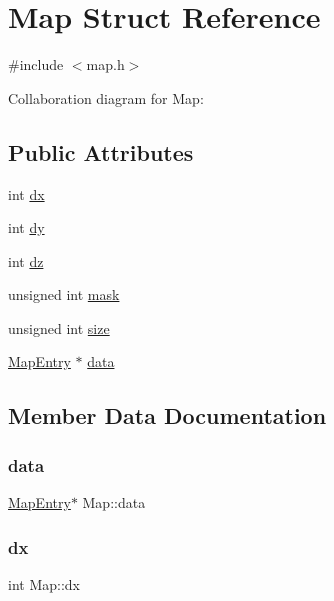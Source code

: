\hypertarget{structMap}{}\section{Map Struct Reference}
\label{structMap}


{\ttfamily \#include $<$map.\+h$>$}



Collaboration diagram for Map\+:
\subsection*{Public Attributes}
\begin{DoxyCompactItemize}
\item 
int \hyperlink{structMap_a991fca09761e4ded5b69269776be11ee}{dx}
\item 
int \hyperlink{structMap_a64d19e88d54fa48e437044c88f674308}{dy}
\item 
int \hyperlink{structMap_a1f17ec06f672496c2582b60dce199f68}{dz}
\item 
unsigned int \hyperlink{structMap_a2211aadc9745a27b0e07a3af85989bd5}{mask}
\item 
unsigned int \hyperlink{structMap_a73754296f937e5d5fbf40b4be90c8e8c}{size}
\item 
\hyperlink{unionMapEntry}{Map\+Entry} $\ast$ \hyperlink{structMap_a8ef299519738b44dc1ae95c6410f0b56}{data}
\end{DoxyCompactItemize}


\subsection{Member Data Documentation}
\mbox{\label{structMap_a8ef299519738b44dc1ae95c6410f0b56}} 
\subsubsection{\texorpdfstring{data}{data}}
{\footnotesize\ttfamily \hyperlink{unionMapEntry}{Map\+Entry}$\ast$ Map\+::data}

\mbox{\label{structMap_a991fca09761e4ded5b69269776be11ee}} 
\subsubsection{\texorpdfstring{dx}{dx}}
{\footnotesize\ttfamily int Map\+::dx}

